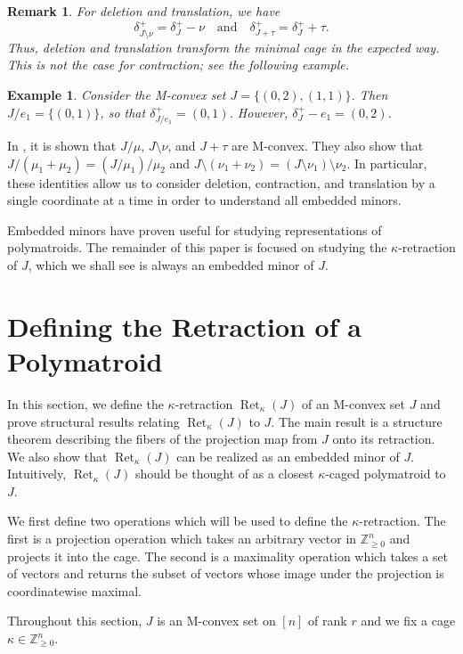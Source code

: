 \documentclass[10pt,a4paper]{amsart}
\newtheorem{remark}[theorem]{Remark}
\newtheorem{example}[theorem]{Example}
\newcommand{\Zgeqn}{\mathbb{Z}_{\geq 0}^n}     %
\newcommand{\delplus}{\delta_J^+}
\DeclareMathOperator{\Ret}{Ret}                %
\newcommand{\RetK}{\Ret_{\kappa}}              %
\begin{document}
\begin{remark} \label{remark:embedded_minor_cage}
For deletion and translation, we have \[
\delta_{J\setminus \nu}^+ = \delplus - \nu \quad \text{and} \quad \delta_{J + \tau}^+ = \delplus + \tau.
\]
Thus, deletion and translation transform the minimal cage in the expected way. This is not the case for contraction; see the following example.
\end{remark}

\begin{example}
Consider the M-convex set $J = \{(0,2),(1,1)\}$. Then $J/e_1 = \{(0,1)\}$, so that $\delta_{J/e_1}^+ = (0,1)$. However, $\delplus - e_1 = (0,2)$.
\end{example}

In \cite{baker2025representationtheorypolymatroids}, it is shown that $J/\mu$, $J \setminus \nu$, and $J + \tau$ are M-convex. They also show that $J /(\mu_1 + \mu_2) = (J/\mu_1) /\mu_2$ and $J \setminus(\nu_1 + \nu_2) = (J\setminus \nu_1) \setminus \nu_2$. In particular, these identities allow us to consider deletion, contraction, and translation by a single coordinate at a time in order to understand all embedded minors.

Embedded minors have proven useful for studying representations of polymatroids. The remainder of this paper is focused on studying the $\kappa$-retraction of $J$, which we shall see is always an embedded minor of $J$.


\section{Defining the Retraction of a Polymatroid}
In this section, we define the $\kappa$-retraction $\RetK(J)$ of an M-convex set $J$ and prove structural results relating $\RetK(J)$ to $J$. The main result is a structure theorem describing the fibers of the projection map from $J$ onto its retraction. We also show that $\RetK(J)$ can be realized as an embedded minor of $J$. Intuitively, $\RetK(J)$ should be thought of as a closest $\kappa$-caged polymatroid to $J$.

We first define two operations which will be used to define the $\kappa$-retraction. The first is a projection operation which takes an arbitrary vector in $\Zgeqn$ and projects it into the cage. The second is a maximality operation which takes a set of vectors and returns the subset of vectors whose image under the projection is coordinatewise maximal.

Throughout this section, $J$ is an M-convex set on $[n]$ of rank $r$ and we fix a cage $\kappa\in\Zgeqn$.
\end{document}
